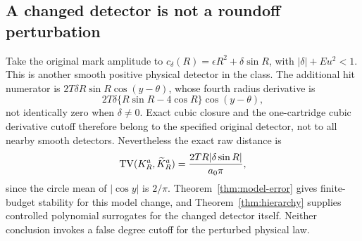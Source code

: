 \subsection{A changed detector is not a roundoff perturbation}
Take the original mark amplitude to $c_\delta(R)=\epsilon R^2+\delta\sin R$, with $|\delta|+Eu^2<1$. This is another smooth positive physical detector in the class. The additional hit numerator is $2T\delta R\sin R\cos(y-\theta)$, whose fourth radius derivative is
\[
 2T\delta\{R\sin R-4\cos R\}\cos(y-\theta),
\]
not identically zero when $\delta\ne0$. Exact cubic closure and the one-cartridge cubic derivative cutoff therefore belong to the specified original detector, not to all nearby smooth detectors. Nevertheless the exact raw distance is
\[
 \operatorname{TV}(K_R^a,\widetilde K_R^a)
 =\frac{2TR|\delta\sin R|}{a_0\pi},
\]
since the circle mean of $|\cos y|$ is $2/\pi$. Theorem~\ref{thm:model-error} gives finite-budget stability for this model change, and Theorem~\ref{thm:hierarchy} supplies controlled polynomial surrogates for the changed detector itself. Neither conclusion invokes a false degree cutoff for the perturbed physical law.

